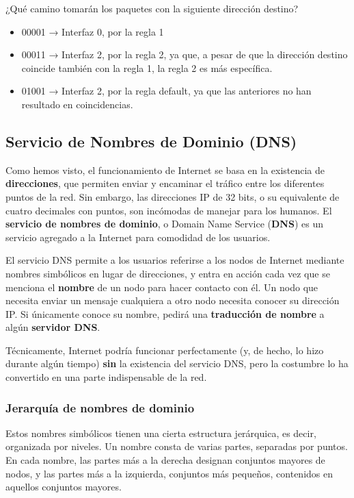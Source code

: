 \documentclass[spanish,A4,]{article}
\begin{document}
¿Qué camino tomarán los paquetes con la siguiente dirección destino?

\begin{itemize}
\itemsep1pt\parskip0pt
\item
  00001 → Interfaz 0, por la regla 1
\item
  00011 → Interfaz 2, por la regla 2, ya que, a pesar de que la
  dirección destino coincide también con la regla 1, la regla 2 es más
  específica.
\item
  01001 → Interfaz 2, por la regla default, ya que las anteriores no han
  resultado en coincidencias.
\end{itemize}

\subsection{Servicio de Nombres de Dominio
(DNS)}\label{servicio-de-nombres-de-dominio-dns}

Como hemos visto, el funcionamiento de Internet se basa en la existencia
de \textbf{direcciones}, que permiten enviar y encaminar el tráfico
entre los diferentes puntos de la red. Sin embargo, las direcciones IP
de 32 bits, o su equivalente de cuatro decimales con puntos, son
incómodas de manejar para los humanos. El \textbf{servicio de nombres de
dominio}, o Domain Name Service (\textbf{DNS}) es un servicio agregado a
la Internet para comodidad de los usuarios.

El servicio DNS permite a los usuarios referirse a los nodos de Internet
mediante nombres simbólicos en lugar de direcciones, y entra en acción
cada vez que se menciona el \textbf{nombre} de un nodo para hacer
contacto con él. Un nodo que necesita enviar un mensaje cualquiera a
otro nodo necesita conocer su dirección IP. Si únicamente conoce su
nombre, pedirá una \textbf{traducción de nombre} a algún
\textbf{servidor DNS}.

Técnicamente, Internet podría funcionar perfectamente (y, de hecho, lo
hizo durante algún tiempo) \textbf{sin} la existencia del servicio DNS,
pero la costumbre lo ha convertido en una parte indispensable de la red.

\subsubsection{Jerarquía de nombres de
dominio}\label{jerarquuxeda-de-nombres-de-dominio}

Estos nombres simbólicos tienen una cierta estructura jerárquica, es
decir, organizada por niveles. Un nombre consta de varias partes,
separadas por puntos. En cada nombre, las partes más a la derecha
designan conjuntos mayores de nodos, y las partes más a la izquierda,
conjuntos más pequeños, contenidos en aquellos conjuntos mayores.
\end{document}
